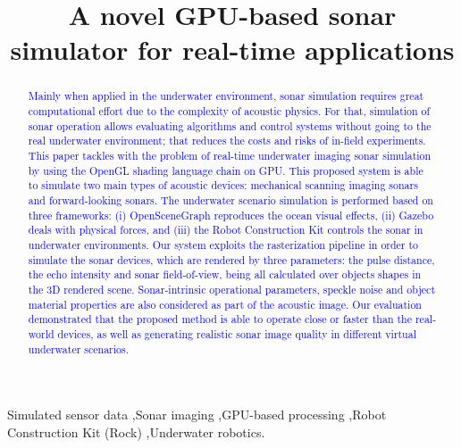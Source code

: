 \documentclass[final,5p,times]{elsarticle}
\begin{document}
\begin{frontmatter}


\title{A novel GPU-based sonar simulator for real-time applications}



\begin{abstract}

\textcolor{blue}{Mainly when applied in the underwater environment, sonar simulation requires great computational effort due to the complexity of acoustic physics. For that, simulation of sonar operation allows evaluating algorithms and control systems without going to the real underwater environment; that reduces the costs and risks of in-field experiments. This paper tackles with the problem of real-time underwater imaging sonar simulation by using the OpenGL shading language chain on GPU. This proposed system is able to simulate two main types of acoustic devices: mechanical scanning imaging sonars and forward-looking sonars. The underwater scenario simulation is performed based on three frameworks: (i) OpenSceneGraph reproduces the ocean visual effects, (ii) Gazebo deals with physical forces, and (iii) the Robot Construction Kit controls the sonar in underwater environments. Our system exploits the rasterization pipeline in order to simulate the sonar devices, which are rendered by three parameters: the pulse distance, the echo intensity and sonar field-of-view, being all calculated over objects shapes in the 3D rendered scene. Sonar-intrinsic operational parameters, speckle noise and object material properties are also considered as part of the acoustic image. Our evaluation demonstrated that the proposed method is able to operate close or faster than the real-world devices, as well as generating realistic sonar image quality in different virtual underwater scenarios.}

\end{abstract}

\begin{keyword}
Simulated sensor data
\sep Sonar imaging
\sep GPU-based processing
\sep Robot Construction Kit (Rock)
\sep Underwater robotics.

\end{keyword}

\end{frontmatter}
\end{document}
